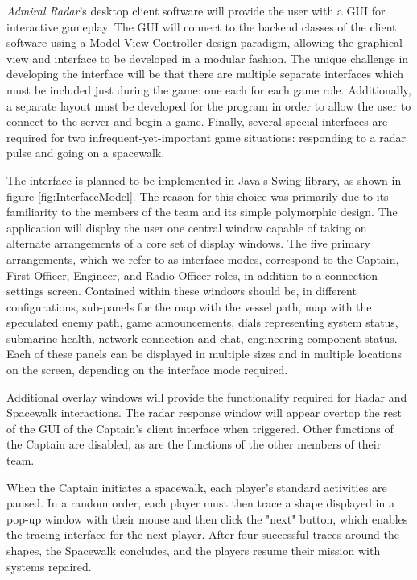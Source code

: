 
\textit{Admiral Radar}'s desktop client software will provide the user with a GUI for interactive gameplay. The GUI will connect to the backend classes of the client software using a Model-View-Controller design paradigm, allowing the graphical view and interface to be developed in a modular fashion. The unique challenge in developing the interface will be that there are multiple separate interfaces which must be included just during the game: one each for each game role. Additionally, a separate layout must be developed for the program in order to allow the user to connect to the server and begin a game. Finally, several special interfaces are required for two infrequent-yet-important game situations: responding to a radar pulse and going on a spacewalk. 

The interface is planned to be implemented in Java's Swing library, as shown in figure \ref{fig:InterfaceModel}. The reason for this choice was primarily due to its familiarity to the members of the team and its simple polymorphic design. The application will display the user one central window capable of taking on alternate arrangements of a core set of display windows. The five primary arrangements, which we refer to as interface modes, correspond to the Captain, First Officer, Engineer, and Radio Officer roles, in addition to a connection settings screen. Contained within these windows should be, in different configurations, sub-panels for the map with the vessel path, map with the speculated enemy path, game announcements, dials representing system status, submarine health, network connection and chat, engineering component status. Each of these panels can be displayed in multiple sizes and in multiple locations on the screen, depending on the interface mode required. 


Additional overlay windows will provide the functionality required for Radar and Spacewalk interactions. The radar response window will appear overtop the rest of the GUI of the Captain's client interface when triggered. Other functions of the Captain are disabled, as are the functions of the other members of their team.


When the Captain initiates a spacewalk, each player's standard activities are paused. In a random order, each player must then trace a shape displayed in a pop-up window with their mouse and then click the "next" button, which enables the tracing interface for the next player. After four successful traces around the shapes, the Spacewalk concludes, and the players resume their mission with systems repaired.

